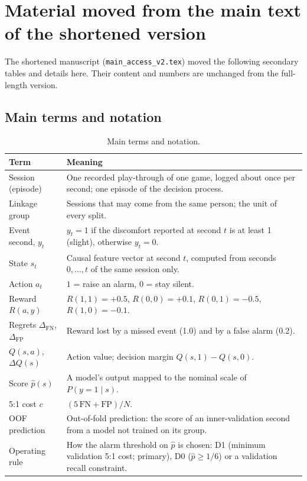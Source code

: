 \section{Material moved from the main text of the shortened version}
\label{sec:s-moved}
The shortened manuscript (\texttt{main\_access\_v2.tex}) moved the following secondary tables and details here. Their content and numbers are unchanged from the full-length version.

\subsection{Main terms and notation}
\begin{table}[h]
\centering
\caption{Main terms and notation.}
\footnotesize
\begin{tabular}{@{}p{}p{}@{}}
\toprule
Term & Meaning \\
\midrule
Session (episode) & One recorded play-through of one game, logged about once per second; one episode of the decision process. \\
Linkage group & Sessions that may come from the same person; the unit of every split. \\
Event second, $y_t$ & $y_t=1$ if the discomfort reported at second $t$ is at least 1 (slight), otherwise $y_t=0$. \\
State $s_t$ & Causal feature vector at second $t$, computed from seconds $0,\dots,t$ of the same session only. \\
Action $a_t$ & $1$ = raise an alarm, $0$ = stay silent. \\
Reward $R(a,y)$ & $R(1,1)=+0.5$, $R(0,0)=+0.1$, $R(0,1)=-0.5$, $R(1,0)=-0.1$. \\
Regrets $\Delta_{\mathrm{FN}}$, $\Delta_{\mathrm{FP}}$ & Reward lost by a missed event (1.0) and by a false alarm (0.2). \\
$Q(s,a)$, $\Delta Q(s)$ & Action value; decision margin $Q(s,1)-Q(s,0)$. \\
Score $\hat p(s)$ & A model's output mapped to the nominal scale of $P(y=1\mid s)$. \\
5:1 cost $c$ & $(5\,\mathrm{FN}+\mathrm{FP})/N$. \\
OOF prediction & Out-of-fold prediction: the score of an inner-validation second from a model not trained on its group. \\
Operating rule & How the alarm threshold on $\hat p$ is chosen: D1 (minimum validation 5:1 cost; primary), D0 ($\hat p\ge1/6$) or a validation recall constraint. \\
\bottomrule
\end{tabular}
\end{table}

